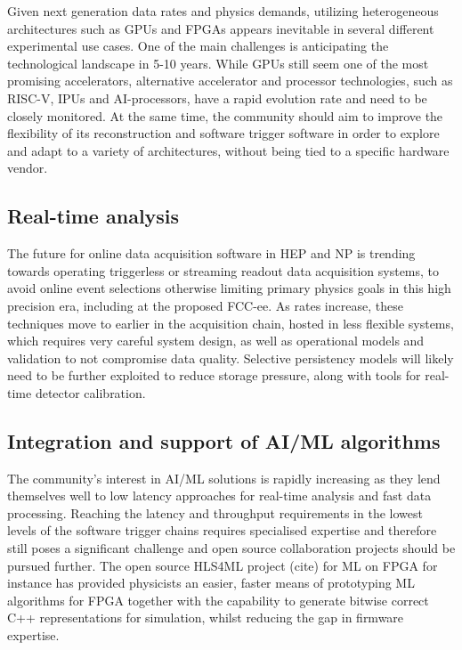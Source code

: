 Given next generation data rates and physics demands, utilizing
heterogeneous architectures such as GPUs and FPGAs appears inevitable in
several different experimental use cases. One of the main challenges is
anticipating the technological landscape in 5-10 years. While GPUs still
seem one of the most promising accelerators, alternative accelerator and
processor technologies, such as RISC-V, IPUs and AI-processors, have a
rapid evolution rate and need to be closely monitored. At the same time,
the community should aim to improve the flexibility of its
reconstruction and software trigger software in order to explore and
adapt to a variety of architectures, without being tied to a specific
hardware vendor.

\subsection{Real-time analysis}\label{real-time-analysis}

The future for online data acquisition software in HEP and NP is
trending towards operating triggerless or streaming readout data
acquisition systems, to avoid online event selections otherwise limiting
primary physics goals in this high precision era, including at the
proposed FCC-ee. As rates increase, these techniques move to earlier in
the acquisition chain, hosted in less flexible systems, which requires
very careful system design, as well as operational models and validation
to not compromise data quality. Selective persistency models will likely
need to be further exploited to reduce storage pressure, along with
tools for real-time detector calibration.

\subsection{Integration and support of AI/ML
algorithms}\label{integration-and-support-of-aiml-algorithms}

The community's interest in AI/ML solutions is rapidly increasing as
they lend themselves well to low latency approaches for real-time
analysis and fast data processing. Reaching the latency and throughput
requirements in the lowest levels of the software trigger chains
requires specialised expertise and therefore still poses a significant
challenge and open source collaboration projects should be pursued
further. The open source HLS4ML project (cite) for ML on FPGA for
instance has provided physicists an easier, faster means of prototyping
ML algorithms for FPGA together with the capability to generate bitwise
correct C++ representations for simulation, whilst reducing the gap in
firmware expertise.

